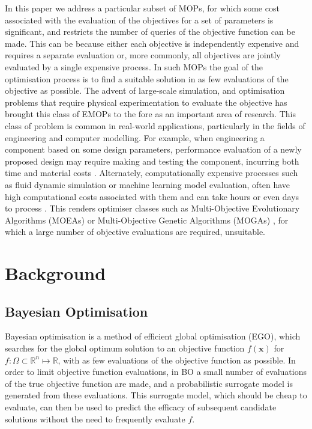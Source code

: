\documentclass[runningheads]{llncs}
\begin{document}
In this paper we address a particular subset of MOPs, for which some cost associated with the evaluation of the objectives for a set of parameters is significant, and restricts the number of queries of the objective function can be made. This can be because either each objective is independently expensive and requires a separate evaluation or, more commonly, all objectives are jointly evaluated by a single expensive process. In such MOPs the goal of the optimisation process is to find a suitable solution in as few evaluations of the objective as possible. The advent of large-scale simulation, and optimisation problems that require physical experimentation to evaluate the objective has brought this class of EMOPs to the fore as an important area of research. This class of problem is common in real-world applications, particularly in the fields of engineering and computer modelling. For example, when engineering a component based on some design parameters, performance evaluation of a newly proposed design may require making and testing the component, incurring both time and material costs \cite{fang2017design}. Alternately, computationally expensive processes such as fluid dynamic simulation or machine learning model evaluation, often have high computational costs associated with them and can take hours or even days to process \cite{huband2005scalable}. This renders optimiser classes such as Multi-Objective Evolutionary Algorithms (MOEAs) \cite{tanabe2017benchmarking,coello2007evolutionary} or Multi-Objective Genetic Algorithms (MOGAs) \cite{tamaki1996multi}, for which a large number of objective evaluations are required, unsuitable. 

\section{Background}
\subsection{Bayesian Optimisation}\label{section:background_BayesianOptimisation}
Bayesian optimisation is a method of efficient global optimisation (EGO), which searches for the global optimum
solution to an objective function $f(\mathbf{x})$ for  $f: \Omega \subset \mathbb{R}^{n} \mapsto \mathbb{R}$, with as few evaluations of the objective function as possible. In order to limit objective function evaluations, in BO a small number of evaluations of the true objective function are made, and a probabilistic surrogate model is generated from these evaluations. This surrogate model, which should be cheap to evaluate, can then be used to predict the efficacy of subsequent candidate solutions without the need to frequently evaluate $f$. 
\end{document}

